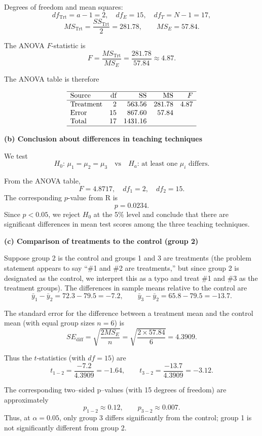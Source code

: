 \documentclass[answers,12pt,addpoints]{exam}
\begin{document}
Degrees of freedom and mean squares:
\[
df_{\text{Trt}} = a-1 = 2,\quad df_E = 15,\quad df_T = N-1 = 17,
\]
\[
MS_{\text{Trt}} = \frac{SS_{\text{Trt}}}{2} = 281.78,\qquad
MS_E = 57.84.
\]

The ANOVA $F$-statistic is
\[
F = \frac{MS_{\text{Trt}}}{MS_E}
= \frac{281.78}{57.84} \approx 4.87.
\]

The ANOVA table is therefore

\[
\begin{array}{lrrrr}
\hline
\text{Source} & \text{df} & \text{SS} & \text{MS} & F \\
\hline
\text{Treatment} & 2  & 563.56 & 281.78 & 4.87 \\
\text{Error}     & 15 & 867.60 & 57.84  &      \\
\text{Total}     & 17 & 1431.16&        &      \\
\hline
\end{array}
\]

\medskip
\textbf{(b) Conclusion about differences in teaching techniques}

We test
\[
H_0:\,\mu_1 = \mu_2 = \mu_3
\quad\text{vs}\quad
H_a:\,\text{at least one }\mu_i\text{ differs}.
\]

From the ANOVA table,
\[
F = 4.8717,\quad df_1 = 2,\quad df_2 = 15.
\]
The corresponding $p$-value from R is
\[
p = 0.0234.
\]
Since $p < 0.05$, we reject $H_0$ at the 5\% level and conclude that there are
significant differences in mean test scores among the three teaching
techniques.

\medskip
\textbf{(c) Comparison of treatments to the control (group 2)}

Suppose group 2 is the control and groups 1 and 3 are treatments (the problem
statement appears to say ``\#1 and \#2 are treatments,'' but since group 2 is
designated as the control, we interpret this as a typo and treat \#1 and \#3 as
the treatment groups). The differences in sample means relative to the control
are
\[
\bar{y}_1 - \bar{y}_2 = 72.3 - 79.5 = -7.2,\qquad
\bar{y}_3 - \bar{y}_2 = 65.8 - 79.5 = -13.7.
\]

The standard error for the difference between a treatment mean and the control
mean (with equal group sizes $n=6$) is
\[
SE_{\text{diff}} = \sqrt{\frac{2 MS_E}{n}}
= \sqrt{\frac{2 \times 57.84}{6}} = 4.3909.
\]

Thus the $t$-statistics (with $df = 15$) are
\[
t_{1-2} = \frac{-7.2}{4.3909} = -1.64,\qquad
t_{3-2} = \frac{-13.7}{4.3909} = -3.12.
\]

The corresponding two–sided p–values (with 15 degrees of freedom) are approximately
\[
p_{1-2} \approx 0.12,\qquad p_{3-2} \approx 0.007.
\]
Thus, at $\alpha = 0.05$, only group 3 differs significantly from the control; group 1 is not significantly different from group 2.
\end{document}
